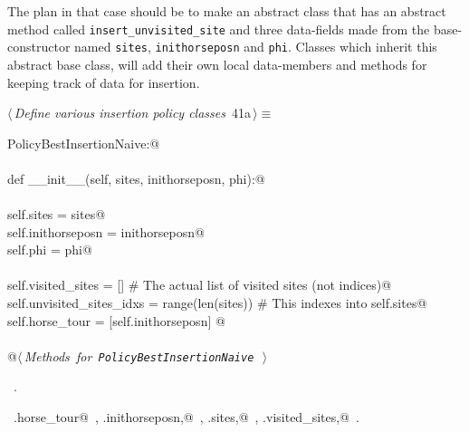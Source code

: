 \documentclass[11.5pt]{report}
\begin{document}
The plan in that case should be to make an abstract class that 
has an abstract method called \texttt{insert\_unvisited\_site}
and three data-fields made from the base-constructor named \texttt{sites}, \texttt{inithorseposn}
and \texttt{phi}. Classes which inherit this abstract base class, will 
add their own local data-members and methods for keeping track of 
data for insertion. 

\begin{flushleft} \small\label{scrap46}\raggedright\small
{} $\langle\,${\itshape Define various insertion policy classes}\nobreak\ {\footnotesize {41a}}$\,\rangle\equiv$
\vspace{-1ex}
\begin{list}{}{} \item
\mbox{}\verb@class PolicyBestInsertionNaive:@\\
\mbox{}\verb@@\\
\mbox{}\verb@    def __init__(self, sites, inithorseposn, phi):@\\
\mbox{}\verb@@\\
\mbox{}\verb@         self.sites           = sites@\\
\mbox{}\verb@         self.inithorseposn   = inithorseposn@\\
\mbox{}\verb@         self.phi             = phi@\\
\mbox{}\verb@@\\
\mbox{}\verb@         self.visited_sites        = []                # The actual list of visited sites (not indices)@\\
\mbox{}\verb@         self.unvisited_sites_idxs = range(len(sites)) # This indexes into self.sites@\\
\mbox{}\verb@         self.horse_tour           = [self.inithorseposn]         @\\
\mbox{}\verb@@\\
\mbox{}\verb@    @\hbox{$\langle\,${\itshape Methods for \verb|PolicyBestInsertionNaive|}\nobreak\ {\footnotesize {}}$\,\rangle$}\verb@@\\
\mbox{}\verb@@{\NWsep}
\end{list}
\vspace{-1.5ex}
\footnotesize
\begin{list}{}{\setlength{\itemsep}{-\parsep}\setlength{\itemindent}{-\leftmargin}}
\item \NWtxtMacroRefIn\ .
\item \NWtxtIdentsDefed\nobreak\  \verb@self.horse_tour@\nobreak\ , \verb@self.inithorseposn,@\nobreak\ , \verb@self.sites,@\nobreak\ , \verb@self.visited_sites,@\nobreak\ .
\item{}
\end{list}
\vspace{4ex}
\end{flushleft}
\end{document}
